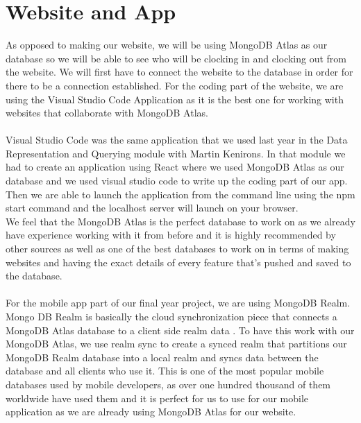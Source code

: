 \section{Website and App}
As opposed to making our website, we will be using MongoDB Atlas as our database so we will be able to see who will be clocking in and clocking out from the website. We will first have to connect the website to the database in order for there to be a connection established. For the coding part of the website, we are using the Visual Studio Code Application as it is the best one for working with websites that collaborate with MongoDB Atlas. 
\\
\\
Visual Studio Code was the same application that we used last year in the Data Representation and Querying module with Martin Kenirons. In that module we had to create an application using React where we used MongoDB Atlas as our database and we used visual studio code to write up the coding part of our app. Then we are able to launch the application from the command line using the npm start command and the localhost server will launch on your browser.
\\
We feel that the MongoDB Atlas is the perfect database to work on as we already have experience working with it from before and it is highly recommended by other sources as well as one of the best databases to work on in terms of making websites and having the exact details of every feature that’s pushed and saved to the database.
\\
\\
For the mobile app part of our final year project, we are using MongoDB Realm. Mongo DB Realm is basically the cloud synchronization piece that connects a MongoDB Atlas database to a client side realm data \cite{MongoDBRealm}. To have this work with our MongoDB Atlas, we use realm sync to create a synced realm that partitions our MongoDB Realm database into a local realm and syncs data between the database and all clients who use it. This is one of the most popular mobile databases used by mobile developers, as over one hundred thousand of them worldwide have used them and it is perfect for us to use for our mobile application as we are already using MongoDB Atlas for our website.
\\
